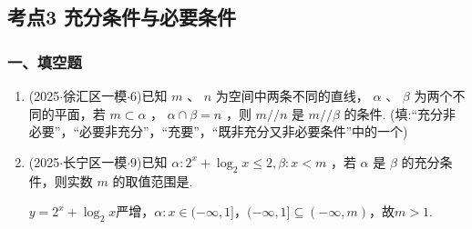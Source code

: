\subsection*{考点3  充分条件与必要条件}

\subsubsection*{一、填空题}
\begin{enumerate}
    \item (2025$\cdot$徐汇区一模$\cdot$6)已知 $m$ 、 $n$ 为空间中两条不同的直线， $\alpha$ 、 $\beta$ 为两个不同的平面，若 $m \subset  \alpha$ ， $\alpha  \cap  \beta  = n$ ，则 $m//n$ 是 $m//\beta$ 的条件. (填:“充分非必要”，“必要非充分”，“充要”，“既非充分又非必要条件”中的一个)
    \item (2025$\cdot$长宁区一模$\cdot$9)已知 $\alpha  : {2}^{x} + {\log }_{2}x \leq  2,\beta  : x < m$ ，若 $\alpha$ 是 $\beta$ 的充分条件，则实数 $m$ 的取值范围是.
    \begin{jieda}
        $y = {2}^{x} + {\log }_{2}x$严增，$\alpha : x \in (-\infty, 1]$，$(-\infty, 1] \subseteq (-\infty, m)$，故$m > 1$.
    \end{jieda}
\end{enumerate}

